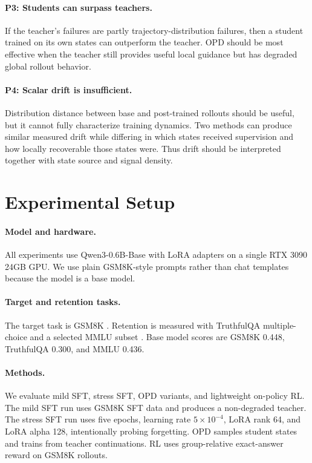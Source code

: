 \documentclass{article}
\begin{document}
\paragraph{P3: Students can surpass teachers.}
If the teacher's failures are partly trajectory-distribution failures, then a
student trained on its own states can outperform the teacher. OPD should be most
effective when the teacher still provides useful local guidance but has degraded
global rollout behavior.

\paragraph{P4: Scalar drift is insufficient.}
Distribution distance between base and post-trained rollouts should be useful,
but it cannot fully characterize training dynamics. Two methods can produce
similar measured drift while differing in which states received supervision and
how locally recoverable those states were. Thus drift should be interpreted
together with state source and signal density.

\section{Experimental Setup}

\paragraph{Model and hardware.}
All experiments use Qwen3-0.6B-Base with LoRA adapters \citep{hu2022lora} on a
single RTX 3090 24GB GPU. We use plain GSM8K-style prompts rather than chat
templates because the model is a base model.

\paragraph{Target and retention tasks.}
The target task is GSM8K \citep{cobbe2021training}. Retention is measured with
TruthfulQA multiple-choice \citep{lin2022truthfulqa} and a selected MMLU subset
\citep{hendrycks2020measuring}. Base model scores are GSM8K 0.448, TruthfulQA 0.300,
and MMLU 0.436.

\paragraph{Methods.}
We evaluate mild SFT, stress SFT, OPD variants, and lightweight on-policy RL. The
mild SFT run uses GSM8K SFT data and produces a non-degraded teacher. The stress
SFT run uses five epochs, learning rate $5\times10^{-4}$, LoRA rank 64, and LoRA
alpha 128, intentionally probing forgetting. OPD samples student states and
trains from teacher continuations. RL uses group-relative exact-answer reward on
GSM8K rollouts.
\end{document}
